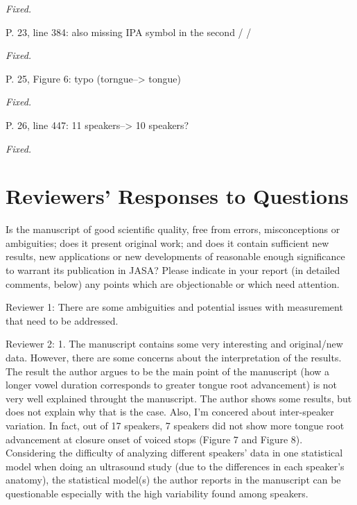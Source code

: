 \documentclass[]{article}
\begin{document}
\begin{adjustwidth}{1cm}{} \textit{
Fixed.
} \end{adjustwidth}

P. 23, line 384: also missing IPA symbol in the second / /

\begin{adjustwidth}{1cm}{} \textit{
Fixed.
} \end{adjustwidth}

P. 25, Figure 6: typo (torngue--\textgreater{} tongue)

\begin{adjustwidth}{1cm}{} \textit{
Fixed.
} \end{adjustwidth}

P. 26, line 447: 11 speakers--\textgreater{} 10 speakers?

\begin{adjustwidth}{1cm}{} \textit{
Fixed.
} \end{adjustwidth}

\hypertarget{reviewers-responses-to-questions}{%
\section{Reviewers' Responses to
Questions}\label{reviewers-responses-to-questions}}

Is the manuscript of good scientific quality, free from errors,
misconceptions or ambiguities; does it present original work; and does
it contain sufficient new results, new applications or new developments
of reasonable enough significance to warrant its publication in JASA?
Please indicate in your report (in detailed comments, below) any points
which are objectionable or which need attention.

Reviewer 1: There are some ambiguities and potential issues with
measurement that need to be addressed.

Reviewer 2: 1. The manuscript contains some very interesting and
original/new data. However, there are some concerns about the
interpretation of the results. The result the author argues to be the
main point of the manuscript (how a longer vowel duration corresponds to
greater tongue root advancement) is not very well explained throught the
manuscript. The author shows some results, but does not explain why that
is the case. Also, I'm concered about inter-speaker variation. In fact,
out of 17 speakers, 7 speakers did not show more tongue root advancement
at closure onset of voiced stops (Figure 7 and Figure 8). Considering
the difficulty of analyzing different speakers' data in one statistical
model when doing an ultrasound study (due to the differences in each
speaker's anatomy), the statistical model(s) the author reports in the
manuscript can be questionable especially with the high variability
found among speakers.
\end{document}
